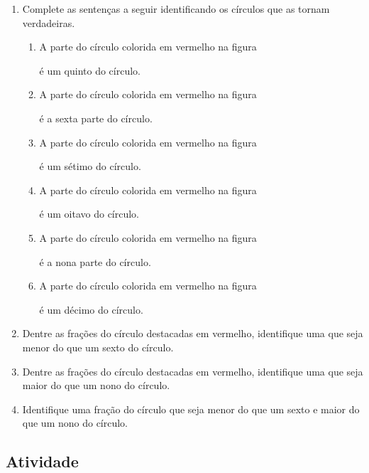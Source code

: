 \begin{enumerate} [\quad a)] %
  \item     Complete as sentenças a seguir identificando os círculos que as tornam verdadeiras.
\begin{enumerate} [\quad I)] %
      \item        	A parte do círculo  colorida em vermelho na figura  é um quinto do círculo.
      \item        	A parte do círculo colorida em vermelho na figura  é a sexta parte do círculo.
      \item        	A parte do círculo colorida em vermelho na figura  é um sétimo do círculo.
      \item        	A parte do círculo colorida em vermelho na figura  é um oitavo do círculo.
      \item        	A parte do círculo colorida em vermelho na figura  é a nona parte do círculo.
      \item        	A parte do círculo colorida em vermelho na figura  é um décimo do círculo.
\end{enumerate} %
  \item     Dentre as frações do círculo destacadas em vermelho, identifique uma que seja menor do que um sexto do círculo.
  \item     Dentre as frações do círculo destacadas em vermelho, identifique uma que seja maior do que um nono do círculo.
  \item     Identifique uma fração do círculo que seja menor do que um sexto e maior do que um nono do círculo.
\end{enumerate} %

\pagebreak
\subsection{Atividade}

